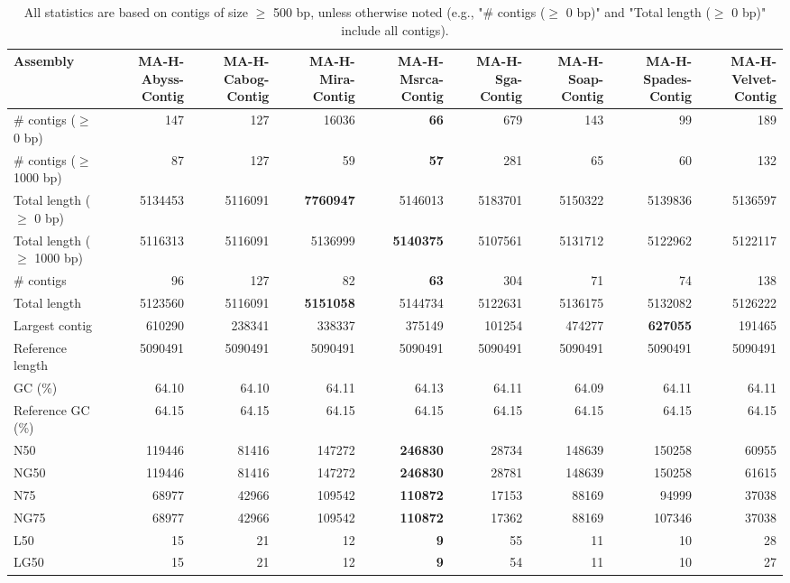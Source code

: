 \documentclass[12pt,a4paper]{article}
\begin{document}
\begin{table}[ht]
\begin{center}
\caption{All statistics are based on contigs of size $\geq$ 500 bp, unless otherwise noted (e.g., "\# contigs ($\geq$ 0 bp)" and "Total length ($\geq$ 0 bp)" include all contigs).}
\begin{tabular}{|l*{8}{|r}|}
\hline
Assembly & MA-H-Abyss-Contig & MA-H-Cabog-Contig & MA-H-Mira-Contig & MA-H-Msrca-Contig & MA-H-Sga-Contig & MA-H-Soap-Contig & MA-H-Spades-Contig & MA-H-Velvet-Contig \\ \hline
\# contigs ($\geq$ 0 bp) & 147 & 127 & 16036 & {\bf 66} & 679 & 143 & 99 & 189 \\ \hline
\# contigs ($\geq$ 1000 bp) & 87 & 127 & 59 & {\bf 57} & 281 & 65 & 60 & 132 \\ \hline
Total length ($\geq$ 0 bp) & 5134453 & 5116091 & {\bf 7760947} & 5146013 & 5183701 & 5150322 & 5139836 & 5136597 \\ \hline
Total length ($\geq$ 1000 bp) & 5116313 & 5116091 & 5136999 & {\bf 5140375} & 5107561 & 5131712 & 5122962 & 5122117 \\ \hline
\# contigs & 96 & 127 & 82 & {\bf 63} & 304 & 71 & 74 & 138 \\ \hline
Total length & 5123560 & 5116091 & {\bf 5151058} & 5144734 & 5122631 & 5136175 & 5132082 & 5126222 \\ \hline
Largest contig & 610290 & 238341 & 338337 & 375149 & 101254 & 474277 & {\bf 627055} & 191465 \\ \hline
Reference length & 5090491 & 5090491 & 5090491 & 5090491 & 5090491 & 5090491 & 5090491 & 5090491 \\ \hline
GC (\%) & 64.10 & 64.10 & 64.11 & 64.13 & 64.11 & 64.09 & 64.11 & 64.11 \\ \hline
Reference GC (\%) & 64.15 & 64.15 & 64.15 & 64.15 & 64.15 & 64.15 & 64.15 & 64.15 \\ \hline
N50 & 119446 & 81416 & 147272 & {\bf 246830} & 28734 & 148639 & 150258 & 60955 \\ \hline
NG50 & 119446 & 81416 & 147272 & {\bf 246830} & 28781 & 148639 & 150258 & 61615 \\ \hline
N75 & 68977 & 42966 & 109542 & {\bf 110872} & 17153 & 88169 & 94999 & 37038 \\ \hline
NG75 & 68977 & 42966 & 109542 & {\bf 110872} & 17362 & 88169 & 107346 & 37038 \\ \hline
L50 & 15 & 21 & 12 & {\bf 9} & 55 & 11 & 10 & 28 \\ \hline
LG50 & 15 & 21 & 12 & {\bf 9} & 54 & 11 & 10 & 27 \\ \hline

\end{tabular}
\end{center}
\end{table}
\end{document}
